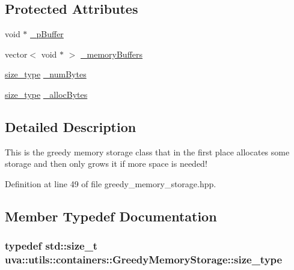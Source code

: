 \subsection*{Protected Attributes}
\begin{DoxyCompactItemize}
\item 
void $\ast$ \hyperlink{classuva_1_1utils_1_1containers_1_1_greedy_memory_storage_ae42e0aec39c716fabdd42e0b6a623c75}{\+\_\+p\+Buffer}
\item 
vector$<$ void $\ast$ $>$ \hyperlink{classuva_1_1utils_1_1containers_1_1_greedy_memory_storage_aaf3a9ba5446c99d9351354232690a449}{\+\_\+memory\+Buffers}
\item 
\hyperlink{classuva_1_1utils_1_1containers_1_1_greedy_memory_storage_a750d36c7e6c18135ccc45bf105f860e5}{size\+\_\+type} \hyperlink{classuva_1_1utils_1_1containers_1_1_greedy_memory_storage_a235c1f54d73f7c62eeaf06d7b0709812}{\+\_\+num\+Bytes}
\item 
\hyperlink{classuva_1_1utils_1_1containers_1_1_greedy_memory_storage_a750d36c7e6c18135ccc45bf105f860e5}{size\+\_\+type} \hyperlink{classuva_1_1utils_1_1containers_1_1_greedy_memory_storage_ab281fe8e8cf3f042a3796de1ad55adc6}{\+\_\+alloc\+Bytes}
\end{DoxyCompactItemize}


\subsection{Detailed Description}
This is the greedy memory storage class that in the first place allocates some storage and then only grows it if more space is needed! 

Definition at line 49 of file greedy\+\_\+memory\+\_\+storage.\+hpp.



\subsection{Member Typedef Documentation}
\hypertarget{classuva_1_1utils_1_1containers_1_1_greedy_memory_storage_a750d36c7e6c18135ccc45bf105f860e5}{}
\subsubsection[{size\+\_\+type}]{\setlength{\rightskip}{0pt plus 5cm}typedef std\+::size\+\_\+t {\bf uva\+::utils\+::containers\+::\+Greedy\+Memory\+Storage\+::size\+\_\+type}}\label{classuva_1_1utils_1_1containers_1_1_greedy_memory_storage_a750d36c7e6c18135ccc45bf105f860e5}



